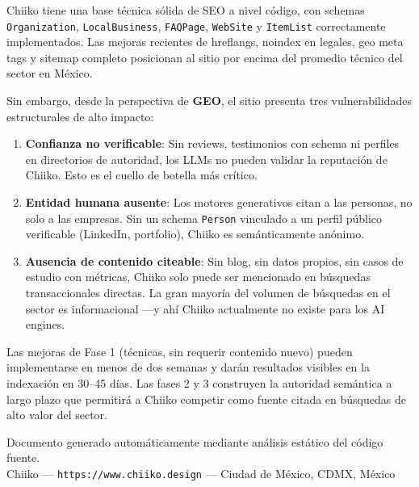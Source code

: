 \documentclass[12pt, a4paper]{article}
\begin{document}
Chiiko tiene una base técnica sólida de SEO a nivel código, con schemas \texttt{Organization}, \texttt{LocalBusiness}, \texttt{FAQPage}, \texttt{WebSite} y \texttt{ItemList} correctamente implementados. Las mejoras recientes de hreflangs, noindex en legales, geo meta tags y sitemap completo posicionan al sitio por encima del promedio técnico del sector en México.

Sin embargo, desde la perspectiva de \textbf{GEO}, el sitio presenta tres vulnerabilidades estructurales de alto impacto:

\begin{enumerate}[itemsep=8pt]
  \item \textbf{Confianza no verificable}: Sin reviews, testimonios con schema ni perfiles en directorios de autoridad, los LLMs no pueden validar la reputación de Chiiko. Esto es el cuello de botella más crítico.

  \item \textbf{Entidad humana ausente}: Los motores generativos citan a las personas, no solo a las empresas. Sin un schema \texttt{Person} vinculado a un perfil público verificable (LinkedIn, portfolio), Chiiko es semánticamente anónimo.

  \item \textbf{Ausencia de contenido citeable}: Sin blog, sin datos propios, sin casos de estudio con métricas, Chiiko solo puede ser mencionado en búsquedas transaccionales directas. La gran mayoría del volumen de búsquedas en el sector es informacional —y ahí Chiiko actualmente no existe para los AI engines.
\end{enumerate}

Las mejoras de Fase 1 (técnicas, sin requerir contenido nuevo) pueden implementarse en menos de dos semanas y darán resultados visibles en la indexación en 30–45 días. Las fases 2 y 3 construyen la autoridad semántica a largo plazo que permitirá a Chiiko competir como fuente citada en búsquedas de alto valor del sector.

\vspace{1cm}
\begin{center}
  \color{gray}\small
  Documento generado automáticamente mediante análisis estático del código fuente.\\
  Chiiko — \texttt{https://www.chiiko.design} — Ciudad de México, CDMX, México
\end{center}
\end{document}
